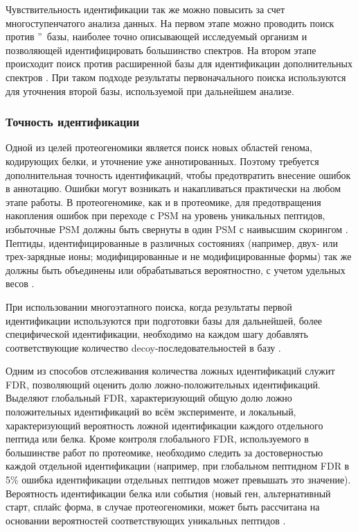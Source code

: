 Чувствительность идентификации так же можно повысить за счет многоступенчатого анализа данных. На первом этапе можно проводить поиск против \textquotedblright\ базы, наиболее точно описывающей исследуемый организм и позволяющей идентифицировать большинство спектров. На втором этапе происходит поиск против расширенной базы для идентификации дополнительных спектров \cite{ning2010computational, helmy2012mass}. При таком подходе результаты первоначального поиска используются для уточнения второй базы, используемой при дальнейшем анализе. 

\subsubsection{Точность идентификации}
Одной из целей протеогеномики является поиск новых областей генома, кодирующих белки, и уточнение уже аннотированных. Поэтому требуется дополнительная точность идентификаций, чтобы предотвратить внесение ошибок в аннотацию. Ошибки могут возникать и накапливаться практически на любом этапе работы. В протеогеномике, как и в протеомике, для предотвращения накопления ошибок при переходе с PSM на уровень уникальных пептидов, избыточные PSM должны быть свернуты в один PSM с наивысшим скорингом \cite{nesvizhskii2010survey}. Пептиды, идентифицированные в различных состояниях (например, двух- или трех-зарядные ионы; модифицированные и не модифицированные формы) так же должны быть объединены или обрабатываться вероятностно, с учетом удельных весов \cite{shteynberg2011iprophet}. 

При использовании многоэтапного поиска, когда результаты первой идентификации используются при подготовки базы для дальнейшей, более специфической идентификации, необходимо на каждом шагу добавлять соответствующие количество decoy-последовательностей в базу \cite{nesvizhskii2010survey}. 

Одним из способов отслеживания количества ложных идентификаций служит FDR, позволяющий оценить долю ложно-положительных идентификаций. Выделяют глобальный FDR, характеризующий общую долю ложно положительных идентификаций во всём эксперименте, и локальный, характеризующий вероятность ложной идентификации каждого отдельного пептида или белка. Кроме контроля глобального FDR, используемого в большинстве работ по протеомике, необходимо следить за достоверностью каждой отдельной идентификации (например, при глобальном пептидном FDR в 5\% ошибка идентификации отдельных пептидов может превышать это значение). Вероятность идентификации белка или события (новый ген, альтернативный старт, сплайс форма, в случае протеогеномики, может быть рассчитана на основании вероятностей соответствующих уникальных пептидов \cite{shteynberg2011iprophet, castellana2010proteogenomics}.

